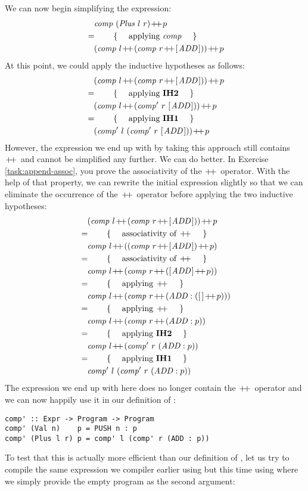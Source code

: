 We can now begin simplifying the expression:
\begin{align*}
\expr{\mathit{comp}~(\mathit{Plus}~l~r) \append p}
\hint{applying $\mathit{comp}$}
\lastexpr{(\mathit{comp}~l \append (\mathit{comp}~r \append \hslist{\mathit{ADD}})) \append p}
\end{align*}
At this point, we could apply the inductive hypotheses as follows:
\begin{align*}
\expr{(\mathit{comp}~l \append (\mathit{comp}~r \append \hslist{\mathit{ADD}})) \append p}
\hint{applying $\mathbf{IH2}$}
\expr{(\mathit{comp}~l \append (\mathit{comp'}~r~ \hslist{\mathit{ADD}})) \append p}
\hint{applying $\mathbf{IH1}$}
\lastexpr{(\mathit{comp'}~l~(\mathit{comp'}~r~ \hslist{\mathit{ADD}})) \append p}
\end{align*}
However, the expression we end up with by taking this approach still contains $\append$ and cannot be simplified any further. We can do better. In Exercise \ref{task:append-assoc}, you prove the associativity of the $\append$ operator. With the help of that property, we can rewrite the initial expression slightly so that we can eliminate the occurrence of the $\append$ operator before applying the two inductive hypotheses:\allowdisplaybreaks
\begin{align*}\allowdisplaybreaks
\expr{(\mathit{comp}~l \append (\mathit{comp}~r \append \hslist{\mathit{ADD}})) \append p}
\hint{associativity of $\append$}
\expr{\mathit{comp}~l \append ((\mathit{comp}~r \append \hslist{\mathit{ADD}}) \append p)}
\hint{associativity of $\append$}
\expr{\mathit{comp}~l \append (\mathit{comp}~r \append (\hslist{\mathit{ADD}} \append p))}
\hint{applying $\append$}
\expr{\mathit{comp}~l \append (\mathit{comp}~r \append (\mathit{ADD} : (\hslist{} \append p)))}
\hint{applying $\append$}
\expr{\mathit{comp}~l \append (\mathit{comp}~r \append (\mathit{ADD} : p))}
\hint{applying $\mathbf{IH2}$}
\expr{\mathit{comp}~l \append (\mathit{comp'}~r~(\mathit{ADD} : p))}
\hint{applying $\mathbf{IH1}$}
\lastexpr{\mathit{comp'}~l~(\mathit{comp'}~r~(\mathit{ADD} : p))}
\end{align*}
The expression we end up with here does no longer contain the $\append$ operator and we can now happily use it in our definition of :
\begin{verbatim}
comp' :: Expr -> Program -> Program 
comp' (Val n)    p = PUSH n : p
comp' (Plus l r) p = comp' l (comp' r (ADD : p))
\end{verbatim}
To test that this is actually more efficient than our definition of , let us try to compile the same expression we compiler earlier using  but this time using  where we simply provide the empty program \haskellIn{[]} as the second argument:

